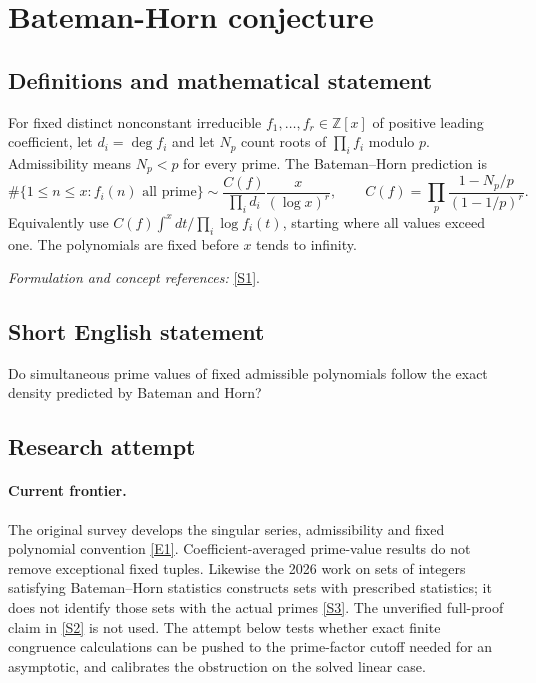 \documentclass[11pt,a4paper]{article}
\numberwithin{equation}{section}
\newcommand{\Z}{\mathbb{Z}}
\newcommand{\sref}[2]{\hyperlink{source:#1:#2}{[S#2]}}
\newcommand{\eref}[2]{\hyperlink{extra:#1:#2}{[E#2]}}
\newif\ifshowcatalogue
\newcommand{\cataloguescope}[1]{\ifshowcatalogue
 \paragraph{Exact scope in the supplied catalogue.}
 \begin{quote}\small #1\end{quote}\fi}
\begin{document}
\setcounter{section}{0}
\section*{\texorpdfstring{Bateman-Horn conjecture}{Bateman-Horn conjecture}}\label{statement}
\subsection{Definitions and mathematical statement}
For fixed distinct nonconstant irreducible $f_1,\ldots,f_r\in\Z[x]$ of positive leading coefficient, let $d_i=\deg f_i$ and let $N_p$ count roots of $\prod_i f_i$ modulo $p$. Admissibility means $N_p<p$ for every prime. The Bateman--Horn prediction is
\[
 \#\{1\le n\le x:f_i(n)\text{ all prime}\}
 \sim\frac{C(f)}{\prod_i d_i}\frac{x}{(\log x)^r},\qquad
 C(f)=\prod_p\frac{1-N_p/p}{(1-1/p)^r}.
\]
Equivalently use $C(f)\int^x dt/\prod_i\log f_i(t)$, starting where all values exceed one. The polynomials are fixed before $x$ tends to infinity.
\par\smallskip\textit{Formulation and concept references:} \sref{statement}{1}.
\cataloguescope{Prove or disprove the Bateman-Horn asymptotic formula for the number of positive integers n up to x for which any fixed admissible finite family of distinct irreducible integer polynomials with positive leading coefficients are simultaneously prime.}
\subsection{Short English statement}
Do simultaneous prime values of fixed admissible polynomials follow the exact density predicted by Bateman and Horn?
\subsection{Research attempt}

\paragraph{Current frontier.}
The original survey develops the singular series, admissibility and fixed
polynomial convention \eref{statement}{1}. Coefficient-averaged prime-value
results do not remove exceptional fixed tuples. Likewise the 2026 work
on sets of integers satisfying Bateman--Horn statistics constructs sets
with prescribed statistics; it does not identify those sets with the
actual primes \sref{statement}{3}. The unverified full-proof claim in
\sref{statement}{2} is not used. The attempt below tests whether exact finite
congruence calculations can be pushed to the prime-factor cutoff needed
for an asymptotic, and calibrates the obstruction on the solved linear case.
\end{document}
